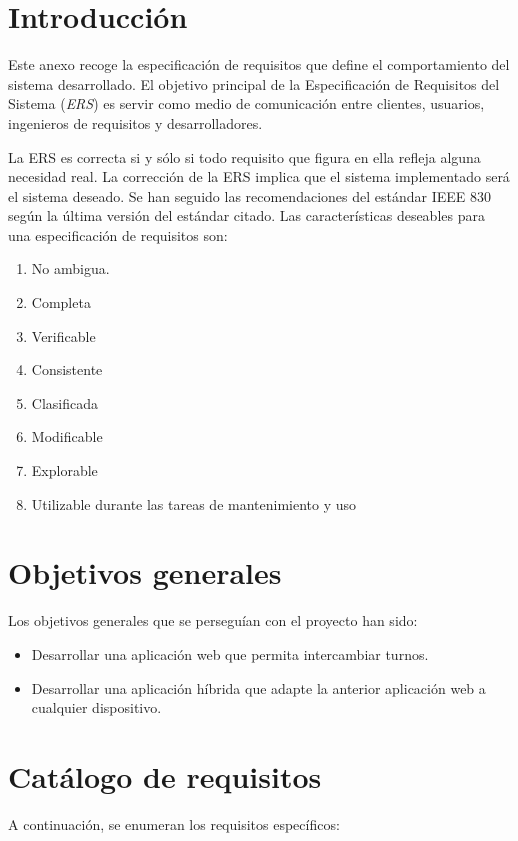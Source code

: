 
\section{Introducción}\label{introduccion-requisitos}

Este anexo recoge la especificación de requisitos que define el comportamiento del sistema desarrollado. El objetivo principal de la Especificación de Requisitos del Sistema (\emph{ERS}) es servir como medio de comunicación entre clientes, usuarios, ingenieros de requisitos y desarrolladores.

La ERS es correcta si y sólo si todo requisito que figura en ella refleja alguna necesidad
real. La corrección de la ERS implica que el sistema implementado será el sistema
deseado. Se han seguido las recomendaciones del estándar IEEE 830 según la última versión del estándar citado. Las características deseables para una especificación de requisitos son:


\begin{enumerate}
	\item No ambigua.
	\item Completa
	\item  Verificable
	\item  Consistente
	\item  Clasificada
	\item  Modificable
	\item  Explorable
	\item  Utilizable durante las tareas de mantenimiento y uso
\end{enumerate}


\section{Objetivos generales}\label{objetivos-generales}
Los objetivos generales que se perseguían con el proyecto han sido:
\begin{itemize}
	\item Desarrollar una aplicación web que permita intercambiar turnos.
	\item Desarrollar una aplicación híbrida que adapte la anterior aplicación web a cualquier dispositivo.
\end{itemize}


\section{Catálogo de requisitos}\label{catalogo-requisitos}
A continuación, se enumeran los requisitos específicos:

